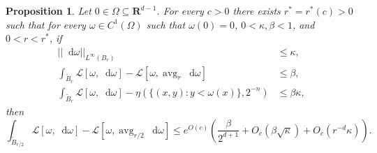 \documentclass[reqno,12pt,letterpaper]{amsart}
\newcommand{\RR}{\mathbf{R}}
\DeclareMathOperator{\avg}{avg}
\newcommand*\dif{\mathop{}\!\mathrm{d}}
\newcommand{\Lagrange}{\mathscr L}
\newtheorem{proposition}[theorem]{Proposition}
\theoremstyle{definition}
\numberwithin{equation}{section}
\begin{document}
\begin{proposition}\label{dGL Laplace}
Let $0 \in \Omega \subseteq \RR^{d - 1}$. For every $c > 0$ there exists $r^* = r^*(c) > 0$ such that for every $\omega \in C^1(\Omega)$ such that $\omega(0) = 0$, $0 < \kappa, \beta < 1$, and $0 < r < r^*$, if
\begin{align}
||\dif \omega||_{L^\infty(B_r)} &\leq \kappa \label{bound on gradient}, \\
\int_{\tilde B_r} \Lagrange[\omega, \dif \omega] - \Lagrange[\omega, \avg_r \dif \omega] &\leq \beta, \label{bound on mean oscillation} \\
\int_{\tilde B_r} \Lagrange[\omega, \dif \omega] - \eta(\{(x, y): y < \omega(x)\}, 2^{-n}) &\leq \beta\kappa \label{bound on surface area},
\end{align}
then
\begin{equation} \label{gain}
\int_{\tilde B_{r/2}} \Lagrange[\omega, \dif \omega] - \Lagrange[\omega, \avg_{r/2} \dif \omega] \leq e^{O(c)}\left(\frac{\beta}{2^{d + 1}} + O_c(\beta \sqrt \kappa) + O_c(r^{-d} \kappa)\right).
\end{equation}
\end{proposition}
\end{document}
